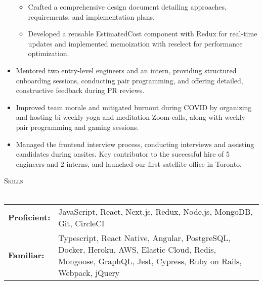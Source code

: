 \documentclass[a4paper]{article}
\newcommand{\header} [1] {
    {\hspace*{-18pt}\vspace*{3pt} \textcolor{deeppurple}{\textsc{#1}}}
    \vspace*{-12pt} \\
    \hspace*{-18pt} \textcolor{deeppurple}{\hrulefill} \\
}
\begin{document}
\begin{itemize}
    \begin{itemize} \itemsep .5pt
            \item Crafted a comprehensive design document detailing approaches, requirements, and implementation plans.
            \item Developed a reusable EstimatedCost component with Redux for real-time updates and implemented memoization with reselect for performance optimization.  
        \end{itemize}
    \item Mentored two entry-level engineers and an intern, providing structured onboarding sessions, conducting pair programming, and offering detailed, constructive feedback during PR reviews.
    \item Improved team morale and mitigated burnout during COVID by organizing and hosting bi-weekly yoga and meditation Zoom calls, along with weekly pair programming and gaming sessions.
    \item Managed the frontend interview process, conducting interviews and assisting candidates during onsites. Key contributor to the successful hire of 5 engineers and 2 interns, and launched our first satellite office in Toronto.
\end{itemize}

\header{Skills}
\vspace{1mm}
\begin{tabular}{ l p{5.2in} }
    \textbf{Proficient:} & JavaScript, React, Next.js, Redux, Node.js, MongoDB, Git, CircleCI \\
    \textbf{Familiar:}   & Typescript, React Native, Angular, PostgreSQL, Docker, Heroku, AWS, Elastic Cloud, Redis, Mongoose, GraphQL, Jest, Cypress, Ruby on Rails, Webpack, jQuery \\
\end{tabular}
\end{document}
